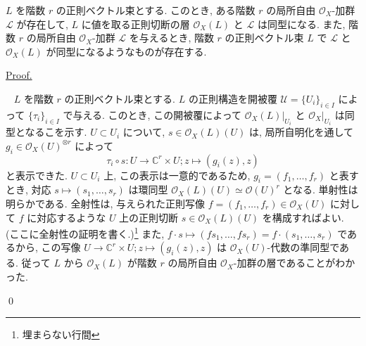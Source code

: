 \documentclass[a4paper,10pt,dvipdfmx]{jsreport}
\newenvironment{theorem*}{\refstepcounter{theorem}\begin{itembox}[l]{\underline{Theorem \arabic{chapter}.\arabic{section}.\arabic{theorem}.}}\vspace{-0.5zh}\ }{\end{itembox}}
\renewenvironment{proof}{\begin{flushleft} \underline{Proof.} \end{flushleft}\vspace{-1zh}\ }{\qed\\}
\newcounter{theorem}[section]
\theoremstyle{definition}
\begin{document}
\begin{theorem*}
    \(L\) を階数 \(r\) の正則ベクトル束とする. このとき, ある階数 \(r\) の局所自由 \(\mathcal{O}_X\)-加群 \(\mathcal{L}\) が存在して, \(L\) に値を取る正則切断の層 \(\mathcal{O}_X(L)\) と \(\mathcal{L}\) は同型になる. また, 階数 \(r\) の局所自由 \(\mathcal{O}_X\)-加群 \(\mathcal{L}\) を与えるとき, 階数 \(r\) の正則ベクトル束 \(L\) で \(\mathcal{L}\) と \(\mathcal{O}_X(L)\) が同型になるようなものが存在する.
\end{theorem*}
\begin{proof}
    \(L\) を階数 \(r\) の正則ベクトル束とする. \(L\) の正則構造を開被覆 \(\mathcal{U} = \{U_i\}_{i\in I}\) によって \(\{\tau_i\}_{i\in I}\) で与える. このとき, この開被覆によって \(\mathcal{O}_X(L)|_{U_i}\) と \(\mathcal{O}_X|_{U_i}\) は同型となるこを示す. \(U\subset U_i\) について, \(s\in \mathcal{O}_X(L)(U)\) は, 局所自明化を通して \(g_i \in \mathcal{O}_X(U)^{\otimes r}\) によって
    \[
        \tau_i \circ s \colon U \to  \mathbb{C}^r \times U;z\mapsto (g_i(z),z)
    \]
    と表示できた. \(U\subset U_i\) 上, この表示は一意的であるため, \(g_i  = (f_1,\ldots,f_r)\) と表すとき, 対応 \(s \mapsto (s_1,\ldots,s_r)\) は環同型 \(\mathcal{O}_X(L)(U) \simeq \mathcal{O}(U)^r\) となる. 単射性は明らかである. 全射性は, 与えられた正則写像 \(f = (f_1, \ldots, f_r) \in \mathcal{O}_X(U)\) に対して \(f\) に対応するような \(U\) 上の正則切断 \(s \in \mathcal{O}_X(L)(U)\) を構成すればよい. (ここに全射性の証明を書く.)\footnote{埋まらない行間} また, \(f\cdot s \mapsto (fs_1,\ldots,fs_r) = f\cdot (s_1,\ldots,s_r)\) であるから, この写像 \(U \to \mathbb{C}^r \times U;z\mapsto (g_i(z),z)\) は \(\mathcal{O}_X(U)\)-代数の準同型である. 従って \(L\) から \(\mathcal{O}_X(L)\) が階数 \(r\) の局所自由 \(\mathcal{O}_X\)-加群の層であることがわかった.


\end{proof}
\end{document}
